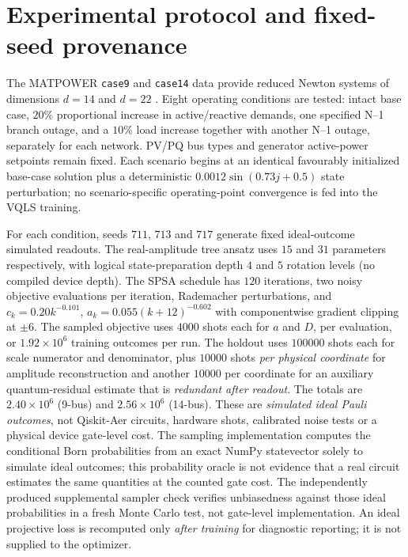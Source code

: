 \documentclass[11pt,a4paper]{article}
\theoremstyle{remark}\newtheorem{remark}[theorem]{Remark}
\begin{document}
\section{Experimental protocol and fixed-seed provenance}\label{sec:method}
The MATPOWER \texttt{case9} and \texttt{case14} data provide reduced Newton systems of dimensions $d=14$ and $d=22$ \citep{zimmerman2011,matpowercase9,matpowercase14}. Eight operating conditions are tested: intact base case, $20\%$ proportional increase in active/reactive demands, one specified N--1 branch outage, and a $10\%$ load increase together with another N--1 outage, separately for each network. PV/PQ bus types and generator active-power setpoints remain fixed. Each scenario begins at an identical favourably initialized base-case solution plus a deterministic $0.0012\sin(0.73j+0.5)$ state perturbation; no scenario-specific operating-point convergence is fed into the VQLS training.

For each condition, seeds $711$, $713$ and $717$ generate fixed ideal-outcome simulated readouts. The real-amplitude tree ansatz uses $15$ and $31$ parameters respectively, with logical state-preparation depth $4$ and $5$ rotation levels (no compiled device depth). The SPSA schedule has $120$ iterations, two noisy objective evaluations per iteration, Rademacher perturbations, and $c_k=0.20k^{-0.101}$, $a_k=0.055(k+12)^{-0.602}$ with componentwise gradient clipping at $\pm6$. The sampled objective uses $4000$ shots each for $a$ and $D$, per evaluation, or $1.92\times10^6$ training outcomes per run. The holdout uses $100000$ shots each for scale numerator and denominator, plus $10000$ shots \emph{per physical coordinate} for amplitude reconstruction and another $10000$ per coordinate for an auxiliary quantum-residual estimate that is \emph{redundant after readout}. The totals are $2.40\times10^6$ (9-bus) and $2.56\times10^6$ (14-bus). These are \emph{simulated ideal Pauli outcomes}, not Qiskit-Aer circuits, hardware shots, calibrated noise tests or a physical device gate-level cost. The sampling implementation computes the conditional Born probabilities from an exact NumPy statevector solely to simulate ideal outcomes; this probability oracle is not evidence that a real circuit estimates the same quantities at the counted gate cost. The independently produced supplemental sampler check verifies unbiasedness against those ideal probabilities in a fresh Monte Carlo test, not gate-level implementation. An ideal projective loss is recomputed only \emph{after training} for diagnostic reporting; it is not supplied to the optimizer.
\end{document}
